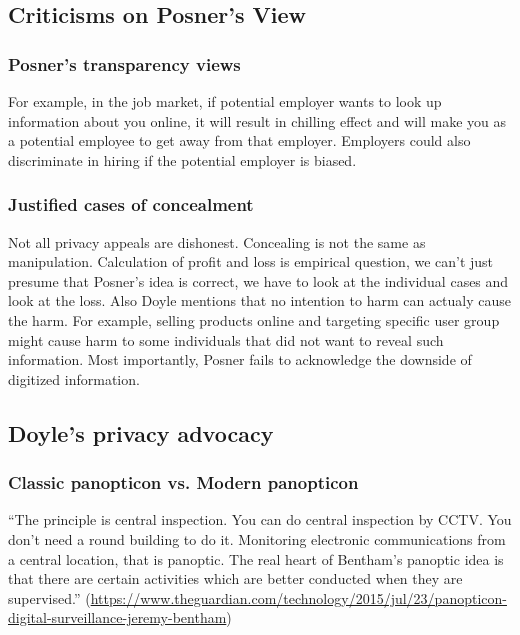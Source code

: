 \documentclass{article}
\begin{document}
\subsection{Criticisms on Posner's View}

\subsubsection*{Posner's transparency views}

For example, in the job market, if potential employer wants to look up information about you online, it will result in chilling effect and will make you as a potential employee to get away from that employer. Employers could also discriminate in hiring if the potential employer is biased.

\subsubsection*{Justified cases of concealment}

Not all privacy appeals are dishonest. Concealing is not the same as manipulation. Calculation of profit and loss is empirical question, we can't just presume that Posner's idea is correct, we have to look at the individual cases and look at the loss. Also Doyle mentions that no intention to harm can actualy cause the harm. For example, selling products online and targeting specific user group might cause harm to some individuals that did not want to reveal such information. Most importantly, Posner fails to acknowledge the downside of digitized information.

\subsection{Doyle's privacy advocacy}

\subsubsection{Classic panopticon vs. Modern panopticon}

“The principle is central inspection. You can do central inspection by CCTV. You don’t need a round building to do it. Monitoring electronic communications from a central location, that is panoptic. The real heart of Bentham’s panoptic idea is that there are certain activities which are better conducted when they are supervised.” (\url{https://www.theguardian.com/technology/2015/jul/23/panopticon-digital-surveillance-jeremy-bentham})
\end{document}
